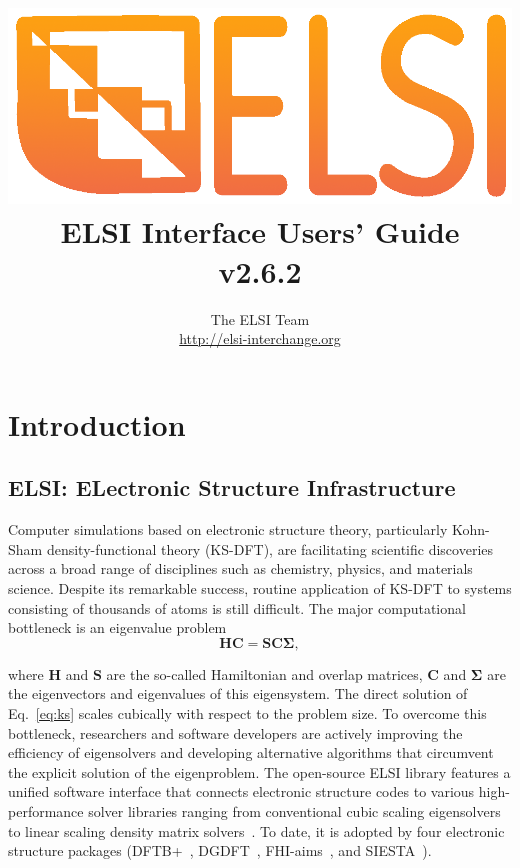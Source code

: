 \documentclass{report}
\begin{document}
\title{\includegraphics[scale=0.07]{elsi_logo.png}\\ \vspace{0.5cm} \textbf{ELSI Interface Users' Guide\\ v2.6.2}}
\author{The ELSI Team\\ \url{http://elsi-interchange.org}}
\maketitle

\tableofcontents

\chapter{Introduction}
\section{ELSI: ELectronic Structure Infrastructure}
\label{sec:elsi}
Computer simulations based on electronic structure theory, particularly Kohn-Sham density-functional theory (KS-DFT), are facilitating scientific discoveries across a broad range of disciplines such as chemistry, physics, and materials science. Despite its remarkable success, routine application of KS-DFT to systems consisting of thousands of atoms is still difficult. The major computational bottleneck is an eigenvalue problem
\begin{equation}
\label{eq:ks}
\boldsymbol{H} \boldsymbol{C} = \boldsymbol{S} \boldsymbol{C} \boldsymbol{\Sigma},
\end{equation}

where $\boldsymbol{H}$ and $\boldsymbol{S}$ are the so-called Hamiltonian and overlap matrices, $\boldsymbol{C}$ and $\boldsymbol{\Sigma}$ are the eigenvectors and eigenvalues of this eigensystem. The direct solution of Eq.~\ref{eq:ks} scales cubically with respect to the problem size. To overcome this bottleneck, researchers and software developers are actively improving the efficiency of eigensolvers and developing alternative algorithms that circumvent the explicit solution of the eigenproblem. The open-source ELSI library features a unified software interface that connects electronic structure codes to various high-performance solver libraries ranging from conventional cubic scaling eigensolvers to linear scaling density matrix solvers~\cite{elsi_yu_2018}. To date, it is adopted by four electronic structure packages (DFTB+~\cite{dftb_aradi_2007}, DGDFT~\cite{dgdft_hu_2015}, FHI-aims~\cite{fhiaims_blum_2009}, and SIESTA~\cite{siesta_soler_2002}).
\end{document}
